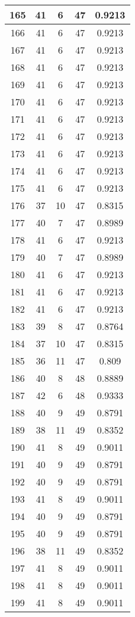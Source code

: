 \documentclass[letterpaper, 12pt]{article}
\begin{document}
\begin{longtable}{|c|c|c|c|c|}
\hline
165 & 41 & 6 & 47 & 0.9213 \\
\hline
166 & 41 & 6 & 47 & 0.9213 \\
\hline
167 & 41 & 6 & 47 & 0.9213 \\
\hline
168 & 41 & 6 & 47 & 0.9213 \\
\hline
169 & 41 & 6 & 47 & 0.9213 \\
\hline
170 & 41 & 6 & 47 & 0.9213 \\
\hline
171 & 41 & 6 & 47 & 0.9213 \\
\hline
172 & 41 & 6 & 47 & 0.9213 \\
\hline
173 & 41 & 6 & 47 & 0.9213 \\
\hline
174 & 41 & 6 & 47 & 0.9213 \\
\hline
175 & 41 & 6 & 47 & 0.9213 \\
\hline
176 & 37 & 10 & 47 & 0.8315 \\
\hline
177 & 40 & 7 & 47 & 0.8989 \\
\hline
178 & 41 & 6 & 47 & 0.9213 \\
\hline
179 & 40 & 7 & 47 & 0.8989 \\
\hline
180 & 41 & 6 & 47 & 0.9213 \\
\hline
181 & 41 & 6 & 47 & 0.9213 \\
\hline
182 & 41 & 6 & 47 & 0.9213 \\
\hline
183 & 39 & 8 & 47 & 0.8764 \\
\hline
184 & 37 & 10 & 47 & 0.8315 \\
\hline
185 & 36 & 11 & 47 & 0.809 \\
\hline
186 & 40 & 8 & 48 & 0.8889 \\
\hline
187 & 42 & 6 & 48 & 0.9333 \\
\hline
188 & 40 & 9 & 49 & 0.8791 \\
\hline
189 & 38 & 11 & 49 & 0.8352 \\
\hline
190 & 41 & 8 & 49 & 0.9011 \\
\hline
191 & 40 & 9 & 49 & 0.8791 \\
\hline
192 & 40 & 9 & 49 & 0.8791 \\
\hline
193 & 41 & 8 & 49 & 0.9011 \\
\hline
194 & 40 & 9 & 49 & 0.8791 \\
\hline
195 & 40 & 9 & 49 & 0.8791 \\
\hline
196 & 38 & 11 & 49 & 0.8352 \\
\hline
197 & 41 & 8 & 49 & 0.9011 \\
\hline
198 & 41 & 8 & 49 & 0.9011 \\
\hline
199 & 41 & 8 & 49 & 0.9011 \\
\hline
\end{longtable}
\end{document}
